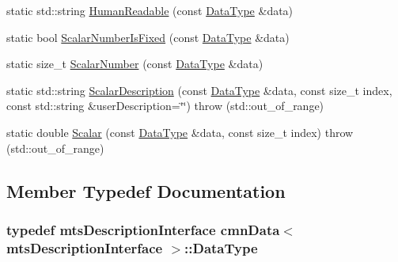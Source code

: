 \begin{DoxyCompactItemize}
\item 
static std\+::string \hyperlink{classcmn_data_3_01mts_description_interface_01_4_a5151940df49f8086d9d2ab5dbf8f10a7}{Human\+Readable} (const \hyperlink{classcmn_data_3_01mts_description_interface_01_4_a17b736179c710a2ad3b114ef631709bb}{Data\+Type} \&data)
\item 
static bool \hyperlink{classcmn_data_3_01mts_description_interface_01_4_a870e5e5955f45ee86aa378000f5b0aaf}{Scalar\+Number\+Is\+Fixed} (const \hyperlink{classcmn_data_3_01mts_description_interface_01_4_a17b736179c710a2ad3b114ef631709bb}{Data\+Type} \&data)
\item 
static size\+\_\+t \hyperlink{classcmn_data_3_01mts_description_interface_01_4_ad1fcb08e4a79af56049209c4316a5ddd}{Scalar\+Number} (const \hyperlink{classcmn_data_3_01mts_description_interface_01_4_a17b736179c710a2ad3b114ef631709bb}{Data\+Type} \&data)
\item 
static std\+::string \hyperlink{classcmn_data_3_01mts_description_interface_01_4_a3c6aef8af389e8178e5cbf121776b3ed}{Scalar\+Description} (const \hyperlink{classcmn_data_3_01mts_description_interface_01_4_a17b736179c710a2ad3b114ef631709bb}{Data\+Type} \&data, const size\+\_\+t index, const std\+::string \&user\+Description=\char`\"{}\char`\"{})  throw (std\+::out\+\_\+of\+\_\+range)
\item 
static double \hyperlink{classcmn_data_3_01mts_description_interface_01_4_a77ef3b918c7b9fc9891c9f26de848cec}{Scalar} (const \hyperlink{classcmn_data_3_01mts_description_interface_01_4_a17b736179c710a2ad3b114ef631709bb}{Data\+Type} \&data, const size\+\_\+t index)  throw (std\+::out\+\_\+of\+\_\+range)
\end{DoxyCompactItemize}


\subsection{Member Typedef Documentation}
\hypertarget{classcmn_data_3_01mts_description_interface_01_4_a17b736179c710a2ad3b114ef631709bb}{}
\subsubsection[{Data\+Type}]{\setlength{\rightskip}{0pt plus 5cm}typedef {\bf mts\+Description\+Interface} {\bf cmn\+Data}$<$ {\bf mts\+Description\+Interface} $>$\+::{\bf Data\+Type}}\label{classcmn_data_3_01mts_description_interface_01_4_a17b736179c710a2ad3b114ef631709bb}


